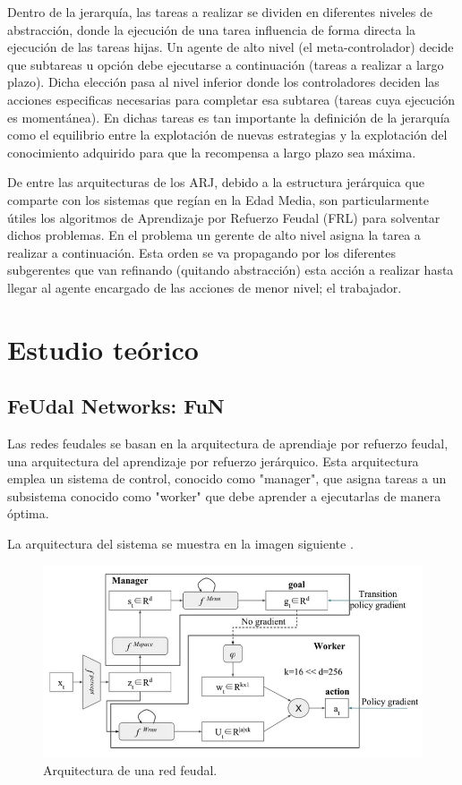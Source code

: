 \documentclass[letterpaper]{article} %
\begin{document}
Dentro de la jerarquía, las tareas a realizar se dividen en diferentes niveles de abstracción, donde la ejecución de una tarea influencia de forma directa la ejecución de las tareas hijas. Un agente de alto nivel (el meta-controlador) decide que subtareas u opción debe ejecutarse a continuación (tareas a realizar a largo plazo). Dicha elección pasa al nivel inferior donde los controladores deciden las acciones especificas necesarias para completar esa subtarea (tareas cuya ejecución es momentánea). En dichas tareas es tan importante la definición de la jerarquía como el equilibrio entre la explotación de nuevas estrategias y la explotación del conocimiento adquirido para que la recompensa a largo plazo sea máxima.

De entre las arquitecturas de los ARJ, debido a la estructura jerárquica que comparte con los sistemas que regían en la Edad Media, son particularmente útiles los algoritmos de Aprendizaje por Refuerzo Feudal (FRL) para solventar dichos problemas. En el problema un gerente de alto nivel asigna la tarea a realizar a continuación. Esta orden se va propagando por los diferentes subgerentes que van refinando (quitando abstracción) esta acción a realizar hasta llegar al agente encargado de las acciones de menor nivel; el trabajador.
\cite {geeksforgeeks2024hrl,sutton1999between,barto2003recent,dietterich2000hierarchical}
\section{Estudio teórico}

\subsection{FeUdal Networks: FuN}

Las redes feudales se basan en la arquitectura de aprendiaje por refuerzo feudal, 
una arquitectura del aprendizaje por refuerzo jerárquico. Esta arquitectura emplea un sistema de control, conocido
como "manager", que asigna tareas a un subsistema conocido como "worker" que debe aprender a ejecutarlas de manera óptima.

La arquitectura del sistema se muestra en la imagen siguiente \cite{feudal_networks_2024}.

\begin{figure}[H]
    \centering
    \includegraphics[width=0.9\columnwidth]{feudal_arquitecture.png}
    \caption{Arquitectura de una red feudal.}
    \label{fig:arquitectura_feudal}
\end{figure}
\end{document}
